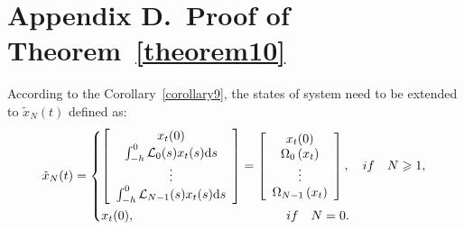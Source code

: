 \documentclass[a4paper]{cas-sc}
\begin{document}
\section*{Appendix D.~Proof of Theorem~\ref{theorem10}}
\label{AppendixD}
According to the Corollary~\ref{corollary9}, the states of system need to be extended to ${\tilde x_N}(t)$ defined as:
\begin{equation}
  {\tilde x_N}(t) = \left\{ \begin{gathered}
    \left[ {\begin{array}{*{20}{c}}
            {{x_t}(0)}                                               \\
            {\int_{ - h}^0 {{\mathcal{L}_0}} (s){x_t}(s){\text{d}}s} \\
            \vdots                                                   \\
            {\int_{ - h}^0 {{\mathcal{L}_{N - 1}}} (s){x_t}(s){\text{d}}s}
          \end{array}} \right] = \left[ {\begin{array}{*{20}{c}}
            {{x_t}(0)}                          \\
            {{\Omega _0}\left( {{x_t}} \right)} \\
            \vdots                              \\
            {{\Omega _{N - 1}}\left( {{x_t}} \right)}
          \end{array}} \right],\quad if\quad N \geqslant 1, \hfill \\
    {x_t}(0),\quad \quad \quad \quad \quad \quad \quad \quad \quad \quad \quad \quad if\quad N = 0. \hfill \\
  \end{gathered}  \right.
  \label{DX}
\end{equation}
\end{document}
